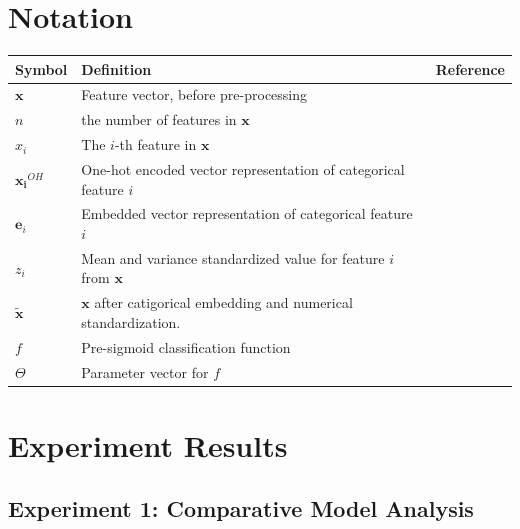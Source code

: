 \documentclass{mldsmsc}
\begin{document}
\section{Notation}
\label{app:notation}

\begin{table}[ht]
    \begin{tabular}{|l|l|l|}
      \hline
        \textbf{Symbol} & \textbf{Definition} & \textbf{Reference} \\
      \hline
        $\mathbf{x}$& Feature vector, before pre-processing &\\
        $n$ & the number of features in $\mathbf{x}$ &\\
        $x_i$& The $i$-th feature in $\mathbf{x}$ &\\
        $\mathbf{x_i}^{OH}$ & One-hot encoded vector representation of categorical feature $i$ &\\
        $\mathbf{e}_i$ & Embedded vector representation of categorical feature $i$ & \\
        $z_i$ & Mean and variance standardized value for feature $i$ from $\mathbf{x}$ &\\
        $\tilde{\mathbf{x}}$ & $\mathbf{x}$ after catigorical embedding and numerical standardization. &\\
        $f$ & Pre-sigmoid classification function &\\
        $\Theta$ & Parameter vector for $f$ & \\
    \hline
    \end{tabular}
\end{table}

\section{Experiment Results}

\subsection{Experiment 1: Comparative Model Analysis}
\end{document}
